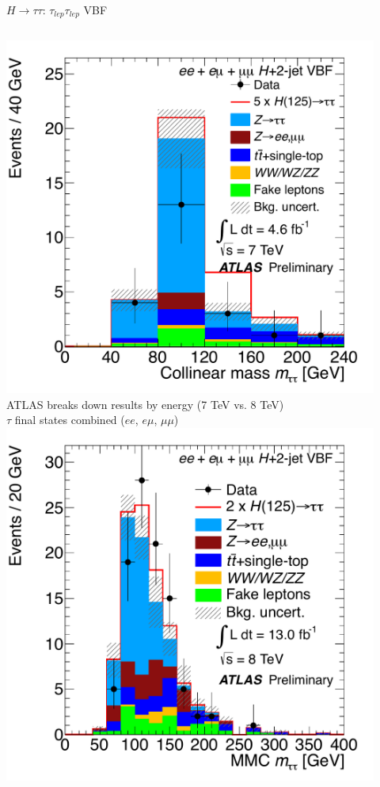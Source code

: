 \documentclass{beamer}
\begin{document}
\begin{frame}{$H \rightarrow \tau\tau$: $\tau_{lep}\tau_{lep}$ VBF}
	\begin{columns}[c]
			\includegraphics[width=0.92\textwidth]{figures/atlas_htautau_leplep_VBF_7TeV.pdf}		
		 \scriptsize
				ATLAS breaks down results by energy (7 TeV vs. 8 TeV) \\
				\textcolor{BrickRed}{$\tau$ final states combined ($ee$, $e\mu$, $\mu\mu$)}
			\includegraphics[width=0.92\textwidth]{figures/atlas_htautau_leplep_VBF_8TeV.pdf} 
	\end{columns}
\end{frame}
\end{document}
